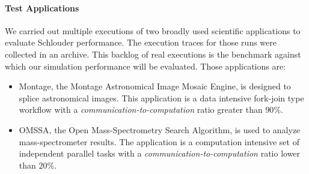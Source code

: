 \documentclass[]{llncs}
\begin{document}
\paragraph{Test Applications}\label{sc:setup}

We  carried out  multiple executions  of two broadly used scientific  applications
to  evaluate Schlouder  performance. The execution traces for  those runs were
collected  in an  archive.  This backlog  of real  executions  is the  benchmark
against which  our simulation  performance will  be evaluated.  Those applications
are:

\begin{itemize}
\item Montage\cite{montage2009},  the Montage Astronomical Image  Mosaic Engine,
  is designed to  splice astronomical images. This application is a data
  intensive fork-join type workflow with a \emph{communication-to-computation} 
  ratio greater than $90\%$.

\item OMSSA\cite{Geer2004}, the Open Mass-Spectrometry Search Algorithm, is used
  to analyze  mass-spectrometer results.  The application  is a computation
  intensive set of independent parallel tasks  with a 
  \emph{communication-to-computation} ratio lower than $20\%$.
\end{itemize}
\end{document}
